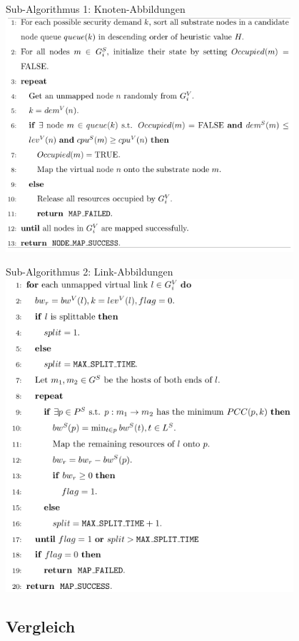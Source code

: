 \documentclass{lni}
\begin{document}
\begin{center}
Sub-Algorithmus 1: Knoten-Abbildungen\newline
	\includegraphics[width=0.8\textwidth]{nodemapping.pdf}\newline
\end{center}
\newpage
\begin{center}
Sub-Algorithmus 2: Link-Abbildungen\newline
	\includegraphics[width=0.8\textwidth]{linkmapping.pdf}\newline
\end{center}



\subsection{Vergleich}
\label{subsec:svne_vergleich}
\end{document}
